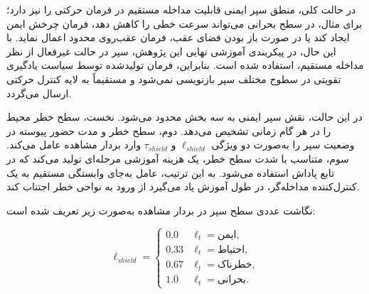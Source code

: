\begin{table}[ht]
	\centering
	\caption{آستانه‌های تعیین سطح سپر ایمنی}
	\label{tab:shield_thresholds_final}
\end{table}

در حالت کلی، منطق سپر ایمنی قابلیت مداخله مستقیم در فرمان حرکتی را نیز دارد؛ برای مثال، در سطح بحرانی می‌تواند سرعت خطی را کاهش دهد، فرمان چرخش ایمن ایجاد کند یا در صورت باز بودن فضای عقب، فرمان عقب‌روی محدود اعمال نماید. با این حال، در پیکربندی آموزشی نهایی این پژوهش، سپر در حالت غیرفعال از نظر مداخله مستقیم، استفاده شده است. بنابراین، فرمان تولیدشده توسط سیاست یادگیری تقویتی در سطوح مختلف سپر بازنویسی نمی‌شود و مستقیماً به لایه کنترل حرکتی ارسال می‌گردد.

در این حالت، نقش سپر ایمنی به سه بخش محدود می‌شود. نخست، سطح خطر محیط را در هر گام زمانی تشخیص می‌دهد. دوم، سطح خطر و مدت حضور پیوسته در وضعیت سپر را به‌صورت دو ویژگی \(\ell_{shield}\) و \(\tau_{shield}\) وارد بردار مشاهده عامل می‌کند. سوم، متناسب با شدت سطح خطر، یک هزینه آموزشی مرحله‌ای تولید می‌کند که در تابع پاداش استفاده می‌شود. به این ترتیب، عامل به‌جای وابستگی مستقیم به یک کنترل‌کننده مداخله‌گر، در طول آموزش یاد می‌گیرد از ورود به نواحی خطر اجتناب کند.

نگاشت عددی سطح سپر در بردار مشاهده به‌صورت زیر تعریف شده است:

\begin{equation}
	\ell_{shield} =
	\begin{cases}
		0.0 & \ell_t=\text{ایمن},\\
		0.33 & \ell_t=\text{احتیاط},\\
		0.67 & \ell_t=\text{خطرناک},\\
		1.0 & \ell_t=\text{بحرانی}.
	\end{cases}
	\label{eq:shield_level_encoding_final}
\end{equation}

